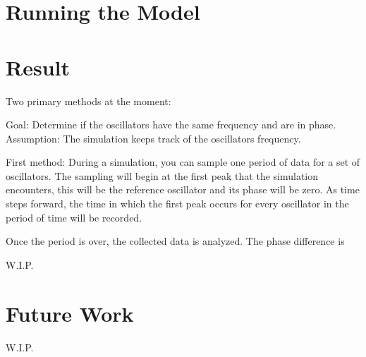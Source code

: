\documentclass{article}
\begin{document}
\section{Running the Model}

\section{Result} %

Two primary methods at the moment:

Goal: Determine if the oscillators have the same frequency and are in phase.
Assumption: The simulation keeps track of the oscillators frequency.

First method:
During a simulation, you can sample one period of data for a set of oscillators. The sampling will begin at the first peak that the simulation encounters, this will be the reference oscillator and its phase will be zero. As time steps forward, the time in which the first peak occurs for every oscillator in the period of time will be recorded. 

Once the period is over, the collected data is analyzed. The phase difference is 

W.I.P.
	

													
\section{Future Work}
W.I.P.



\end{document}
